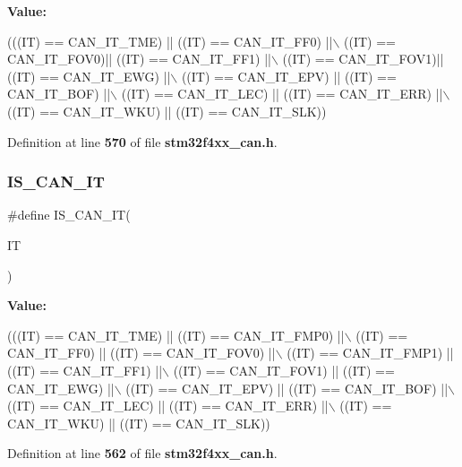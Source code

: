 {\bfseries Value\+:}
\begin{DoxyCode}
(((IT) == CAN_IT_TME) || ((IT) == CAN_IT_FF0)    ||\(\backslash\)
                             ((IT) == CAN_IT_FOV0)|| ((IT) == CAN_IT_FF1)    ||\(\backslash\)
                             ((IT) == CAN_IT_FOV1)|| ((IT) == CAN_IT_EWG)    ||\(\backslash\)
                             ((IT) == CAN_IT_EPV) || ((IT) == CAN_IT_BOF)    ||\(\backslash\)
                             ((IT) == CAN_IT_LEC) || ((IT) == CAN_IT_ERR)    ||\(\backslash\)
                             ((IT) == CAN_IT_WKU) || ((IT) == CAN_IT_SLK))
\end{DoxyCode}


Definition at line \textbf{ 570} of file \textbf{ stm32f4xx\+\_\+can.\+h}.

\mbox{\label{group__CAN__interrupts_gac0a9467bb0028c5fcd15a8a0ec6aaecb}} 
\subsubsection{I\+S\+\_\+\+C\+A\+N\+\_\+\+IT}
{\footnotesize\ttfamily \#define I\+S\+\_\+\+C\+A\+N\+\_\+\+IT(\begin{DoxyParamCaption}\item[{}]{IT }\end{DoxyParamCaption})}

{\bfseries Value\+:}
\begin{DoxyCode}
(((IT) == CAN_IT_TME) || ((IT) == CAN_IT_FMP0)  ||\(\backslash\)
                             ((IT) == CAN_IT_FF0)  || ((IT) == CAN_IT_FOV0)  ||\(\backslash\)
                             ((IT) == CAN_IT_FMP1) || ((IT) == CAN_IT_FF1)   ||\(\backslash\)
                             ((IT) == CAN_IT_FOV1) || ((IT) == CAN_IT_EWG)   ||\(\backslash\)
                             ((IT) == CAN_IT_EPV)  || ((IT) == CAN_IT_BOF)   ||\(\backslash\)
                             ((IT) == CAN_IT_LEC)  || ((IT) == CAN_IT_ERR)   ||\(\backslash\)
                             ((IT) == CAN_IT_WKU)  || ((IT) == CAN_IT_SLK))
\end{DoxyCode}


Definition at line \textbf{ 562} of file \textbf{ stm32f4xx\+\_\+can.\+h}.

